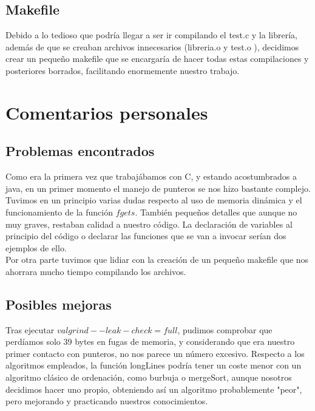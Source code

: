 \section{Makefile}
Debido a lo tedioso que podría llegar a ser ir compilando el test.c y la librería, además de que se creaban archivos innecesarios (libreria.o y test.o ), decidimos crear un pequeño makefile que se encargaría de hacer todas estas compilaciones y posteriores borrados, facilitando enormemente nuestro trabajo.
\chapter{Comentarios personales}
\section{Problemas encontrados}
Como era la primera vez que trabajábamos con C, y estando acostumbrados a java, en un primer momento el manejo de punteros se nos hizo bastante complejo. Tuvimos en un principio varias dudas respecto al uso de memoria dinámica y el funcionamiento de la función $fgets$.
También pequeños detalles que aunque no muy graves, restaban calidad a nuestro código. La declaración de variables al principio del código o declarar las funciones que se van a invocar serían dos ejemplos de ello. \\
Por otra parte tuvimos que lidiar con la creación de un pequeño makefile que nos ahorrara mucho tiempo compilando los archivos.
\section{Posibles mejoras}
Tras ejecutar $valgrind --leak-check=full$, pudimos comprobar que perdíamos solo 39 bytes en fugas de memoria, y considerando que era nuestro primer contacto con punteros, no nos parece un número excesivo. Respecto a los algoritmos empleados, la función longLines podría tener un coste menor con un algoritmo clásico de ordenación, como burbuja o mergeSort, aunque nosotros decidimos hacer uno propio, obteniendo así un algoritmo probablemente "peor", pero mejorando y practicando nuestros conocimientos.
